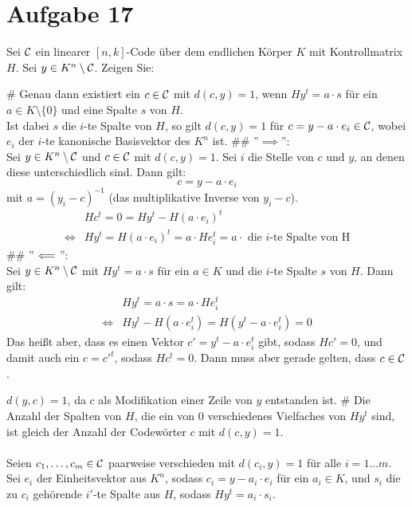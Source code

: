 
\setcounter{MaxMatrixCols}{20}

\section*{Aufgabe 17}
Sei $\mathcal{C}$ ein linearer $[n,k]$-Code über dem endlichen Körper $K$ mit Kontrollmatrix $H$.
Sei $y \in K^n \setminus \mathcal{C}$. Zeigen Sie:
\begin{myList}
#
Genau dann existiert ein $c \in \mathcal{C}$ mit $d(c,y)=1$, wenn $Hy^t = a \cdot s$ für ein $a \in K \setminus \lbrace 0 \rbrace$ und eine Spalte $s$ von $H$.\\
Ist dabei $s$ die $i$-te Spalte von $H$, so gilt $d(c,y) = 1$ für $c = y -a\cdot e_i \in \mathcal{C}$, wobei $e_i$ der $i$-te kanonische Basisvektor des $K^n$ ist.
## ''$\implies$'':\\
Sei $y\in K^n\setminus\mathcal{C}$ und $c\in\mathcal{C}$ mit $d(c, y)=1$. Sei $i$ die Stelle von $c$ und $y$, an denen diese unterschiedlich sind. Dann gilt:
$$c = y - a\cdot e_i$$
mit $a = (y_i - c)^{-1}$ (das multiplikative Inverse von $y_i-c$).\\
\begin{align*}
& Hc^t = 0 = Hy^t - H(a\cdot e_i)^t\\
\iff & Hy^t = H(a\cdot e_i)^t = a\cdot He_i^t = a\cdot\text{ die $i$-te Spalte von H}
\end{align*}
## ''$\hspace{3pt}\Longleftarrow\hspace{3pt}$'':\\
Sei $y\in K^n\setminus\mathcal{C}$ mit $Hy^t = a\cdot s$ für ein $a\in K$ und die $i$-te Spalte $s$ von $H$. Dann gilt:
\begin{align*}
& Hy^t = a\cdot s = a\cdot He_i^t\\
\iff & Hy^t - H(a\cdot e_i^t) = H(y^t - a\cdot e_i^t) = 0
\end{align*}
Das heißt aber, dass es einen Vektor $c'=y^t - a\cdot e_i^t$ gibt, sodass $Hc'=0$, und damit auch ein $c=c'^t$, sodass $Hc^t=0$. Dann muss aber gerade gelten, dass $c\in\mathcal{C}$.

$d(y, c)=1$, da $c$ als Modifikation einer Zeile von $y$ entstanden ist.
#
Die Anzahl der Spalten von $H$, die ein von 0 verschiedenes Vielfaches von $Hy^t$ sind, ist gleich der Anzahl der Codewörter $c$ mit $d(c,y) = 1$.\\\\
Seien $c_1, \ldots, c_m\in\mathcal{C}$ paarweise verschieden mit $d(c_i, y) = 1$ für alle $i=1\ldots m$. Sei $e_i$ der Einheitsvektor aus $K^n$, sodass $c_i=y - a_i\cdot e_i$ für ein $a_i\in K$, und $s_i$ die zu $c_i$ gehörende $i'$-te Spalte aus $H$, sodass $Hy^t=a_i\cdot s_i$.


\end{myList}
